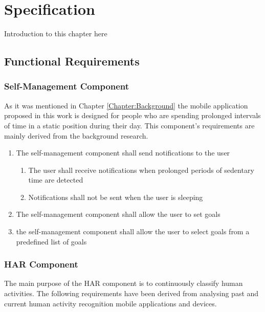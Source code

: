 \chapter{Specification}
\label{Chapter:Specification}

Introduction to this chapter here


\section{Functional Requirements}

    \subsection{Self-Management Component}
    As it was mentioned in Chapter \ref{Chapter:Background} the mobile application proposed in this work is designed for people who are spending prolonged intervals of time in a static position during their day. This component's requirements are mainly derived from the background research. 
    
    \begin{enumerate}
        \item The self-management component shall send notifications to the user
        \begin{enumerate}
            \item The user shall receive notifications when prolonged periods of sedentary time are detected 
            \item Notifications shall not be sent when the user is sleeping
        \end{enumerate}
        \item The self-management component shall allow the user to set goals
        \item the self-management component shall allow the user to select goals from a predefined list of goals
    \end{enumerate}
    
    
    \subsection{HAR Component}
    The main purpose of the HAR component is to continuously classify human activities. The following requirements have been derived from analysing past and current human activity recognition mobile applications and devices.
    
